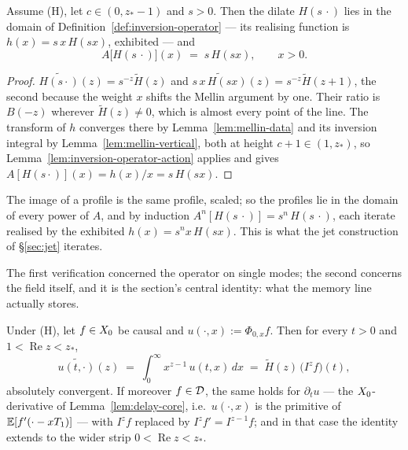 \begin{lemma}\label{lem:profile-eigenfunction}
Assume (H), let $c \in (0, z_*-1)$ and $s > 0$. Then the dilate $H(s\,\cdot)$ lies in the domain of
Definition~\ref{def:inversion-operator} --- its realising function is $h(x) = s\,x\,H(sx)$,
exhibited --- and
\[
  A\bigl[H(s\,\cdot)\bigr](x) \;=\; s\,H(sx), \qquad x > 0 .
\]
\end{lemma}

\begin{proof}
$\widetilde{H(s\cdot)}(z) = s^{-z}\tilde H(z)$ and $\widetilde{s\,x\,H(sx)}(z) = s^{-z}\tilde
H(z+1)$, the second because the weight $x$ shifts the Mellin argument by one. Their ratio is
$B(-z)$ wherever $\tilde H(z) \ne 0$, which is almost every point of the line. The transform of
$h$ converges there by Lemma~\ref{lem:mellin-data} and its inversion integral by
Lemma~\ref{lem:mellin-vertical}, both at height $c+1 \in (1, z_*)$, so
Lemma~\ref{lem:inversion-operator-action} applies and gives $A[H(s\cdot)](x) = h(x)/x =
s\,H(sx)$.
\end{proof}

The image of a profile is the same profile, scaled; so the profiles lie in the domain of every
power of $A$, and by induction $A^n[H(s\,\cdot)] = s^n\,H(s\,\cdot)$, each iterate realised by
the exhibited $h(x) = s^n x\,H(sx)$. This is what the jet construction of \S\ref{sec:jet}
iterates.

The first verification concerned the operator on single modes; the second concerns the
field itself, and it is the section's central identity: what the memory line actually
stores.

\begin{lemma}\label{lem:memory-fractional-integrals}
Under (H), let $f \in X_0$ be causal and $u(\cdot, x) := \Phi_{0,x} f$. Then for every $t > 0$
and $1 < \operatorname{Re} z < z_*$,
\[
  \widetilde{u(t, \cdot)}(z) \;=\; \int_0^\infty x^{z-1}\, u(t, x)\,dx
  \;=\; \tilde H(z)\,\bigl(I^{z} f\bigr)(t),
\]
absolutely convergent. If moreover $f \in \mathcal{D}$, the same holds for $\partial_t u$ --- the
$X_0$-derivative of Lemma~\ref{lem:delay-core}, i.e.\ $u(\cdot, x)$ is the primitive of
$\mathbb{E}[f'(\cdot - xT_1)]$ --- with $I^z f$ replaced by $I^z f' = I^{z-1} f$; and in that case the
identity extends to the wider strip $0 < \operatorname{Re} z < z_*$.
\end{lemma}


